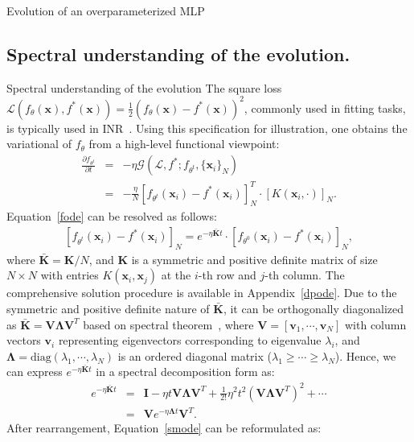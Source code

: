 \documentclass[aspectratio=169,xcolor=dvipsnames]{beamer}
\begin{document}
\begin{frame}{Evolution of an overparameterized MLP}
\end{frame}

\subsection{Spectral understanding of the evolution.}
\begin{frame}{Spectral understanding of the evolution}
The square loss $\mathcal{L}(f_\theta(\bm{x}),f^*(\bm{x}))=\frac{1}{2}(f_\theta(\bm{x})-f^*(\bm{x}))^2$, commonly used in fitting tasks, is typically used in INR~\cite{sitzmann2020implicit,tancik2020fourier,li2023regularize}. Using this specification for illustration, one obtains the variational of $f_\theta$ from a high-level functional viewpoint:
\begin{eqnarray} \label{fode}
	\frac{\partial f_{\theta^t}}{\partial t}&=&-\eta\mathcal{G}(\mathcal{L},f^*;f_{\theta^t},\{\bm{x}_i\}_N)\nonumber\\
	&=&-\frac{\eta}{N}\left[f_{\theta^t}(\bm{x}_i)-f^*(\bm{x}_i)\right]^T_N\cdot \left[K(\bm{x}_i,\cdot)\right]_N.
\end{eqnarray}
Equation~\ref{fode} can be resolved as follows:
\begin{eqnarray}\label{smode}
	\left[f_{\theta^t}(\bm{x}_i)-f^*(\bm{x}_i)\right]_N=e^{-\eta\bar{\bm{K}}t}\cdot\left[f_{\theta^0}(\bm{x}_i)-f^*(\bm{x}_i)\right]_N,
\end{eqnarray}
where $\bar{\bm{K}}=\bm{K}/N$, and $\bm{K}$ is a symmetric and positive definite matrix of size $N\times N$ with entries $K(\bm{x}_i,\bm{x}_j)$ at the $i$-th row and $j$-th column. The comprehensive solution procedure is available in Appendix~\ref{dpode}. Due to the symmetric and positive definite nature of $\bar{\bm{K}}$, it can be orthogonally diagonalized as $\bar{\bm{K}}=\bm{V}\bm{\Lambda} \bm{V}^T$ based on spectral theorem~\cite{hall2013quantum}, where $\bm{V}=[\bm{v}_1,\cdots,\bm{v}_N]$ with column vectors $\bm{v}_i$ representing eigenvectors corresponding to eigenvalue $\lambda_i$, and $\bm{\Lambda}=\text{diag}(\lambda_1,\cdots,\lambda_N)$ is an ordered diagonal matrix ($\lambda_1\geq\cdots\geq\lambda_N$). Hence, we can express $e^{-\eta\bar{\bm{K}}t}$ in a spectral decomposition form as:
\begin{eqnarray}
	e^{-\eta\bar{\bm{K}}t}&=&\bm{I}-\eta t\bm{V}\bm{\Lambda} \bm{V}^T+\frac{1}{2!}\eta^2t^2(\bm{V}\bm{\Lambda} \bm{V}^T)^2+\cdots\nonumber\\
	&=&\bm{V}e^{-\eta\bm{\Lambda} t}\bm{V}^T.
\end{eqnarray}
After rearrangement, Equation~\ref{smode} can be reformulated as:

\end{frame}
\end{document}

